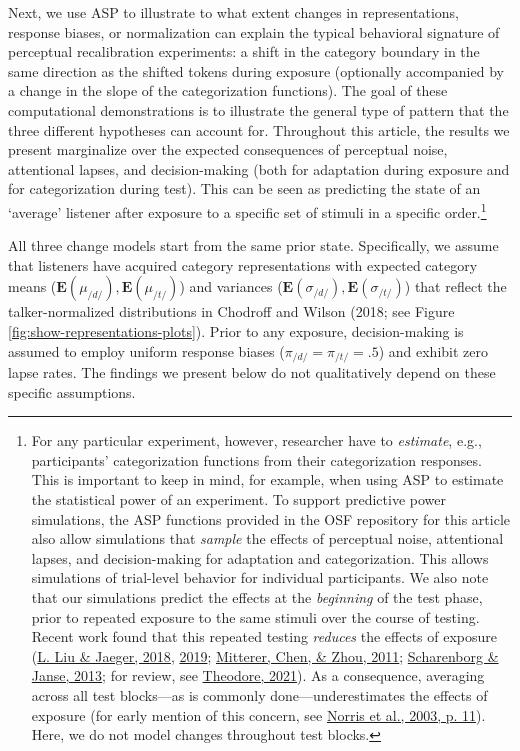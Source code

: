\documentclass[
  11pt,
  english,
  man,floatsintext]{apa6}
\begin{document}
Next, we use ASP to illustrate to what extent changes in representations, response biases, or normalization can explain the typical behavioral signature of perceptual recalibration experiments: a shift in the category boundary in the same direction as the shifted tokens during exposure (optionally accompanied by a change in the slope of the categorization functions). The goal of these computational demonstrations is to illustrate the general type of pattern that the three different hypotheses can account for. Throughout this article, the results we present marginalize over the expected consequences of perceptual noise, attentional lapses, and decision-making (both for adaptation during exposure and for categorization during test). This can be seen as predicting the state of an `average' listener after exposure to a specific set of stimuli in a specific order.\footnote{For any particular experiment, however, researcher have to \emph{estimate}, e.g., participants' categorization functions from their categorization responses. This is important to keep in mind, for example, when using ASP to estimate the statistical power of an experiment. To support predictive power simulations, the ASP functions provided in the OSF repository for this article also allow simulations that \emph{sample} the effects of perceptual noise, attentional lapses, and decision-making for adaptation and categorization. This allows simulations of trial-level behavior for individual participants. We also note that our simulations predict the effects at the \emph{beginning} of the test phase, prior to repeated exposure to the same stimuli over the course of testing. Recent work found that this repeated testing \emph{reduces} the effects of exposure (\protect\hyperlink{ref-liu-jaeger2018}{L. Liu \& Jaeger, 2018}, \protect\hyperlink{ref-liu-jaeger2019}{2019}; \protect\hyperlink{ref-mitterer2011-perceptual-recalibration}{Mitterer, Chen, \& Zhou, 2011}; \protect\hyperlink{ref-scharenborg-janse2013}{Scharenborg \& Janse, 2013}; for review, see \protect\hyperlink{ref-theodore2021}{Theodore, 2021}). As a consequence, averaging across all test blocks---as is commonly done---underestimates the effects of exposure (for early mention of this concern, see \protect\hyperlink{ref-norris2003}{Norris et al., 2003, p. 11}). Here, we do not model changes throughout test blocks.}

All three change models start from the same prior state. Specifically, we assume that listeners have acquired category representations with expected category means (\(\mathbf{E}(\mu_{/d/}), \mathbf{E}(\mu_{/t/})\)) and variances (\(\mathbf{E}(\sigma_{/d/}), \mathbf{E}(\sigma_{/t/})\)) that reflect the talker-normalized distributions in Chodroff and Wilson (2018; see Figure \ref{fig:show-representations-plots}). Prior to any exposure, decision-making is assumed to employ uniform response biases (\(\pi_{/d/}=\pi_{/t/}=.5\)) and exhibit zero lapse rates. The findings we present below do not qualitatively depend on these specific assumptions.
\end{document}
